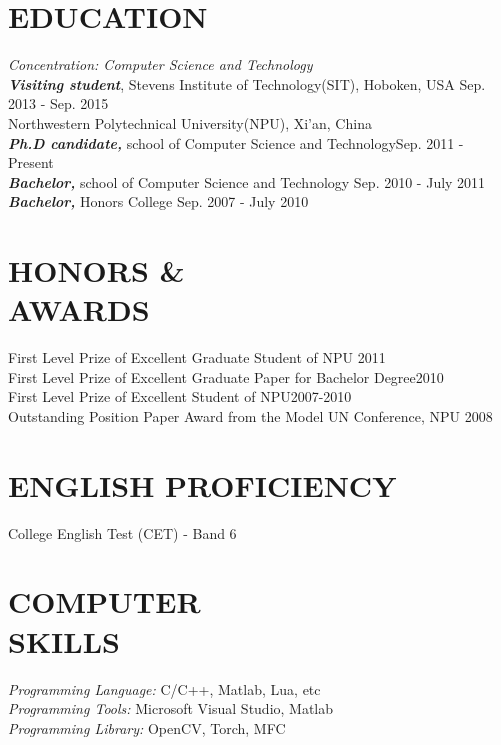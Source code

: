 \documentclass[margin]{res}
\begin{document}
\begin{resume}
\section{EDUCATION}
                {\sl Concentration: Computer Science and Technology}\\
                {\sl\bf Visiting student}, Stevens Institute of Technology(SIT), Hoboken, USA \hfill Sep. 2013 - Sep. 2015\\
                Northwestern Polytechnical University(NPU), Xi'an, China\\
                {\sl\bf Ph.D candidate,} school of Computer Science and Technology\hfill Sep. 2011 - Present\\
                {\sl\bf Bachelor,} school of Computer Science and Technology \hfill Sep. 2010 - July 2011\\
                {\sl\bf Bachelor,} Honors College \hfill Sep. 2007 - July 2010

\section{HONORS  \& \\AWARDS}
                First Level Prize of Excellent Graduate Student of NPU \hfill 2011\\
                First Level Prize of Excellent Graduate Paper for Bachelor Degree\hfill 2010\\
                First Level Prize of Excellent Student of NPU\hfill 2007-2010\\
                Outstanding Position Paper Award from the Model UN Conference, NPU \hfill 2008

\section{ENGLISH PROFICIENCY}
                College English Test (CET) - Band 6

\section{COMPUTER \\ SKILLS} {\sl Programming Language:} C/C++, Matlab, Lua, etc\\
                {\sl Programming Tools:} Microsoft Visual Studio, Matlab\\
                {\sl Programming Library:} OpenCV, Torch, MFC


\end{resume}
\end{document}
